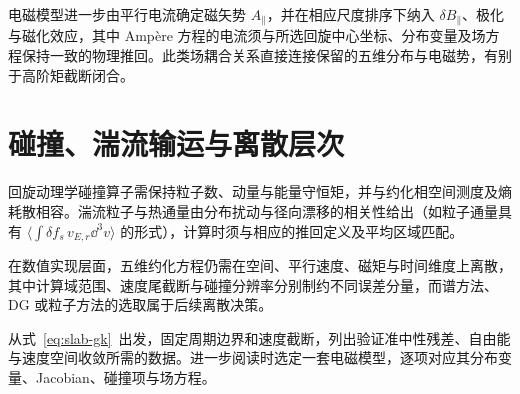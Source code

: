 电磁模型进一步由平行电流确定磁矢势 $A_\parallel$，并在相应尺度排序下纳入 $\delta B_\parallel$、极化与磁化效应，其中 Amp\`ere 方程的电流须与所选回旋中心坐标、分布变量及场方程保持一致的物理推回。此类场耦合关系直接连接保留的五维分布与电磁势，有别于高阶矩截断闭合。

\section{碰撞、湍流输运与离散层次}
回旋动理学碰撞算子需保持粒子数、动量与能量守恒矩，并与约化相空间测度及熵耗散相容。湍流粒子与热通量由分布扰动与径向漂移的相关性给出（如粒子通量具有 $\langle\int\delta f_s\,v_{E,r}\dd^3v\rangle$ 的形式），计算时须与相应的推回定义及平均区域匹配。

在数值实现层面，五维约化方程仍需在空间、平行速度、磁矩与时间维度上离散，其中计算域范围、速度尾截断与碰撞分辨率分别制约不同误差分量，而谱方法、DG 或粒子方法的选取属于后续离散决策。

{从式~\eqref{eq:slab-gk}~出发，固定周期边界和速度截断，列出验证准中性残差、自由能与速度空间收敛所需的数据。进一步阅读时选定一套电磁模型，逐项对应其分布变量、Jacobian、碰撞项与场方程。}
